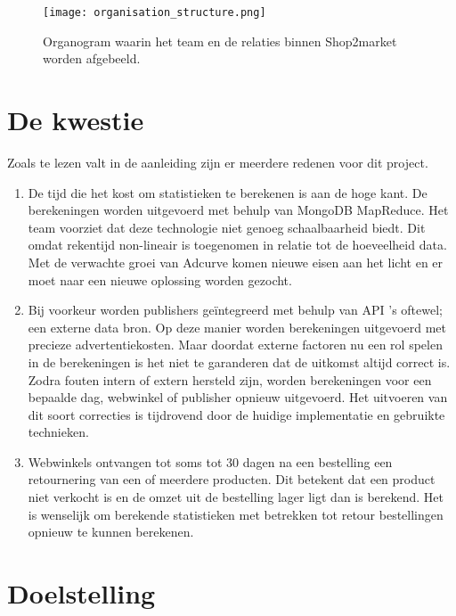 \begin{figure}[h]
    \texttt{[image: organisation\_structure.png]}
    \caption{Organogram waarin het team en de relaties binnen Shop2market worden afgebeeld.}
    \label{fig:orgchart}
\end{figure}

\clearpage

\section{De kwestie} %

Zoals te lezen valt in de aanleiding zijn er meerdere redenen voor dit project.

\begin{enumerate}
    \item De tijd die het kost om statistieken te berekenen is aan de hoge kant. De berekeningen worden uitgevoerd met behulp van MongoDB MapReduce. Het team voorziet dat deze technologie niet genoeg schaalbaarheid biedt. Dit omdat rekentijd non-lineair is toegenomen in relatie tot de hoeveelheid data. Met de verwachte groei van Adcurve komen nieuwe eisen aan het licht en er moet naar een nieuwe oplossing worden gezocht.
    \item Bij voorkeur worden publishers geïntegreerd met behulp van API 's oftewel; een externe data bron. Op deze manier worden berekeningen uitgevoerd met precieze advertentiekosten. Maar doordat externe factoren nu een rol spelen in de berekeningen is het niet te garanderen dat de uitkomst altijd correct is. Zodra fouten intern of extern hersteld zijn, worden berekeningen voor een bepaalde dag, webwinkel of publisher opnieuw uitgevoerd. Het uitvoeren van dit soort correcties is tijdrovend door de huidige implementatie en gebruikte technieken.
    \item Webwinkels ontvangen tot soms tot 30 dagen na een bestelling een retournering van een of meerdere producten. Dit betekent dat een product niet verkocht is en de omzet uit de bestelling lager ligt dan is berekend. Het is wenselijk om berekende statistieken met betrekken tot retour bestellingen opnieuw te kunnen berekenen.
\end{enumerate}

\section{Doelstelling} %
\label{sec:doelstelling}

